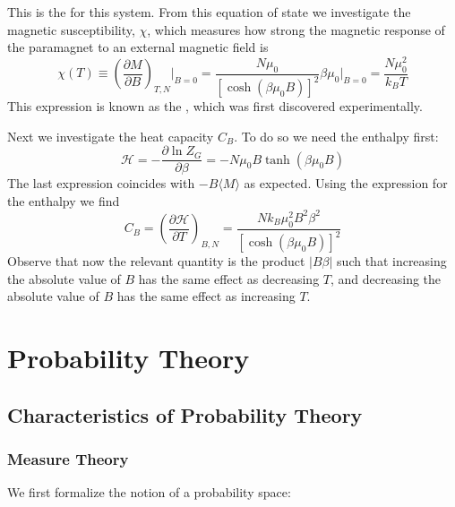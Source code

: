 \documentclass[12pt, a4paper, oneside, openright, titlepage]{book}
\begin{document}
This is the  for this system. From this equation of state we investigate the magnetic susceptibility, $\chi$, which measures how strong the magnetic response of the paramagnet to an external magnetic field is \begin{equation*}
    \chi(T) \equiv\left(\frac{\partial M}{\partial B}\right)_{T,N}\Big\rvert_{B=0} = \frac{N\mu_0}{[\cosh(\beta\mu_0B)]^2}\beta\mu_0\Big\vert_{B=0} = \frac{N\mu_0^2}{k_BT}
\end{equation*}
This expression is known as the , which was first discovered experimentally.

Next we investigate the heat capacity $C_B$. To do so we need the enthalpy first: \begin{equation*}
    \mathcal{H} = -\frac{\partial \ln Z_G}{\partial \beta} = -N\mu_0B\tanh(\beta\mu_0B)
\end{equation*}
The last expression coincides with $-B\langle M\rangle$ as expected. Using the expression for the enthalpy we find \begin{equation*}
    C_B = \left(\frac{\partial \mathcal{H}}{\partial T}\right)_{B,N} = \frac{Nk_B\mu_0^2B^2\beta^2}{[\cosh(\beta\mu_0B)]^2}
\end{equation*}
Observe that now the relevant quantity is the product $|B\beta|$ such that increasing the absolute value of $B$ has the same effect as decreasing $T$, and decreasing the absolute value of $B$ has the same effect as increasing $T$.




\part{Probability Theory}


\chapter{Characteristics of Probability Theory}

\section{Measure Theory}

We first formalize the notion of a probability space:
\end{document}
